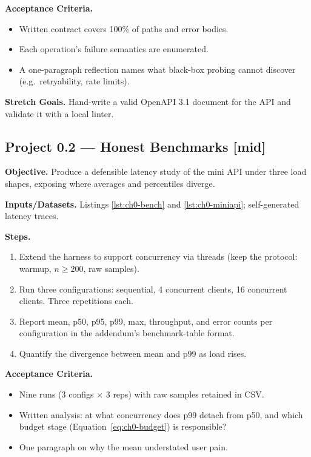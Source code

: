 \textbf{Acceptance Criteria.}
\begin{itemize}
  \item[$\square$] Written contract covers 100\% of paths and error bodies.
  \item[$\square$] Each operation's failure semantics are enumerated.
  \item[$\square$] A one-paragraph reflection names what black-box probing
    cannot discover (e.g.\ retryability, rate limits).
\end{itemize}

\textbf{Stretch Goals.} Hand-write a valid OpenAPI 3.1 document for the API
and validate it with a local linter.

\subsection{Project 0.2 --- Honest Benchmarks \textnormal{[mid]}}

\textbf{Objective.} Produce a defensible latency study of the mini API under
three load shapes, exposing where averages and percentiles diverge.

\textbf{Inputs/Datasets.} Listings \ref{lst:ch0-bench} and
\ref{lst:ch0-miniapi}; self-generated latency traces.

\textbf{Steps.}
\begin{enumerate}
  \item Extend the harness to support concurrency via threads (keep the
        protocol: warmup, $n \geq 200$, raw samples).
  \item Run three configurations: sequential, 4 concurrent clients, 16
        concurrent clients. Three repetitions each.
  \item Report mean, p50, p95, p99, max, throughput, and error counts per
        configuration in the addendum's benchmark-table format.
  \item Quantify the divergence between mean and p99 as load rises.
\end{enumerate}

\textbf{Acceptance Criteria.}
\begin{itemize}
  \item[$\square$] Nine runs (3 configs $\times$ 3 reps) with raw samples
    retained in CSV.
  \item[$\square$] Written analysis: at what concurrency does p99 detach
    from p50, and which budget stage (Equation~\eqref{eq:ch0-budget}) is
    responsible?
  \item[$\square$] One paragraph on why the mean understated user pain.
\end{itemize}

